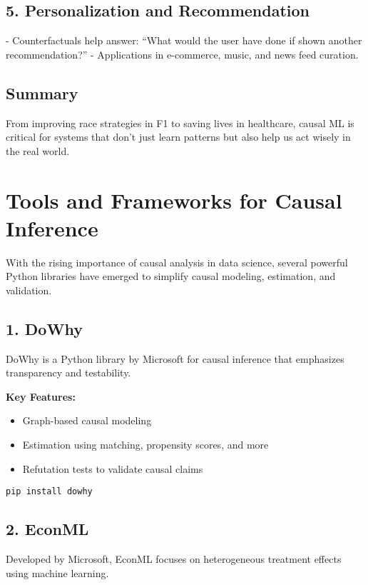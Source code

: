 \documentclass[12pt]{book}
\begin{document}
\subsection*{5. Personalization and Recommendation}

- Counterfactuals help answer: “What would the user have done if shown another recommendation?”
- Applications in e-commerce, music, and news feed curation.

\subsection*{Summary}

From improving race strategies in F1 to saving lives in healthcare, causal ML is critical for systems that don’t just learn patterns but also help us act wisely in the real world.

\section{Tools and Frameworks for Causal Inference}

With the rising importance of causal analysis in data science, several powerful Python libraries have emerged to simplify causal modeling, estimation, and validation.

\subsection*{1. DoWhy}

DoWhy is a Python library by Microsoft for causal inference that emphasizes transparency and testability.

\textbf{Key Features:}
\begin{itemize}
    \item Graph-based causal modeling
    \item Estimation using matching, propensity scores, and more
    \item Refutation tests to validate causal claims
\end{itemize}

\texttt{pip install dowhy}

\subsection*{2. EconML}

Developed by Microsoft, EconML focuses on heterogeneous treatment effects using machine learning.
\end{document}
